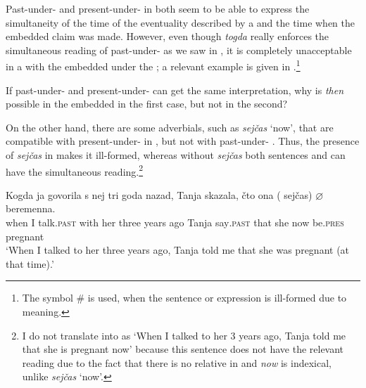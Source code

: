 \documentclass[output=paper,modfonts,newtxmath,hidelinks]{langscibook}
\begin{document}
Past-under- and present-under- in  both seem to be able to express the simultaneity of the time of the eventuality described by a  and the time when the embedded claim was made. However, even though \textit{togda} really enforces the simultaneous reading of past-under- as we saw in  , it is completely unacceptable in a  with the  embedded under the ; a relevant example is given in .\footnote{The symbol {\#} is used, when the sentence or expression is ill-formed due to meaning.}

\label{20:ex4}
\z

\noindent If past-under- and present-under- can get the same interpretation, why is \textit{then} possible in the embedded  in the first case, but not in the second?

On the other hand, there are some adverbials, such as \textit{sejčas} ‘now’, that are compatible with present-under- in  , but not with past-under- . Thus, the presence of \textit{sejčas} in  makes it ill-formed, whereas without \textit{sejčas} both sentences  and  can have the simultaneous reading.\footnote{\label{20:fn6}I do not translate  into  as `When I talked to her 3 years ago, Tanja told me that she is pregnant now' because this  sentence does not have the relevant reading due to the fact that there is no relative  in  and \textit{now} is indexical, unlike \textit{sejčas} `now'.}

\ea \label{20:ex5}
\gll Kogda ja govorila s nej tri goda nazad, Tanja skazala, čto ona\hspace{10pt} (\hspace{-2pt} sejčas) ${\varnothing}$  beremenna.\\
     when I talk\textsc{.past} with her three years ago Tanja say\textsc{.past} that she {} now be.\textsc{pres} pregnant\\
\glt `When I talked to her three years ago, Tanja told me that she was pregnant (at that time).'
\z
\end{document}
